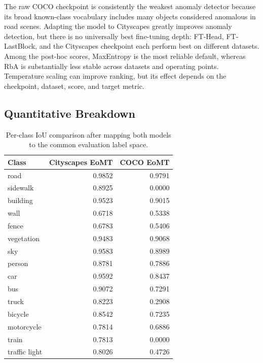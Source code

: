 \documentclass[10pt,twocolumn,letterpaper]{article}
\begin{document}
The raw COCO checkpoint is consistently the weakest anomaly detector because its broad known-class vocabulary includes many objects considered anomalous in road scenes. Adapting the model to Cityscapes greatly improves anomaly detection, but there is no universally best fine-tuning depth: FT-Head, FT-LastBlock, and the Cityscapes checkpoint each perform best on different datasets. Among the post-hoc scores, MaxEntropy is the most reliable default, whereas RbA is substantially less stable across datasets and operating points. Temperature scaling can improve ranking, but its effect depends on the checkpoint, dataset, score, and target metric.

\subsection{Quantitative Breakdown}

\begin{table}[t]
    \centering
    \caption{Per-class IoU comparison after mapping both models to the common evaluation label space.}
    \label{tab:step4_per_class}
    \begin{tabular}{lrr}
        \hline
        Class & Cityscapes EoMT & COCO EoMT \\
        \hline
        road & 0.9852 & 0.9791 \\
        sidewalk & 0.8925 & 0.0000 \\
        building & 0.9523 & 0.9015 \\
        wall & 0.6718 & 0.5338 \\
        fence & 0.6783 & 0.5406 \\
        vegetation & 0.9483 & 0.9068 \\
        sky & 0.9583 & 0.8989 \\
        person & 0.8781 & 0.7886 \\
        car & 0.9592 & 0.8437 \\
        bus & 0.9072 & 0.7291 \\
        truck & 0.8223 & 0.2908 \\
        bicycle & 0.8542 & 0.7235 \\
        motorcycle & 0.7814 & 0.6886 \\
        train & 0.7813 & 0.0000 \\
        traffic light & 0.8026 & 0.4726 \\
        \hline
    \end{tabular}
\end{table}
\end{document}

